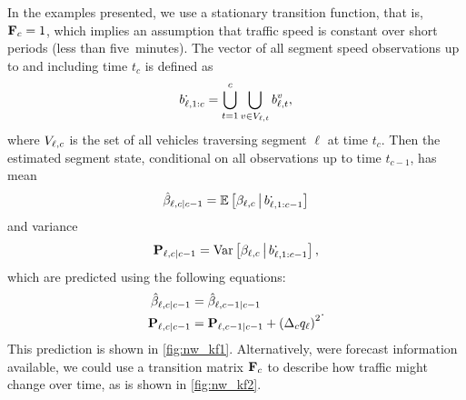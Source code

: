 In the examples presented, we use a stationary transition function, that is, $\mathbf{F}_c = 1$, which implies an assumption that traffic speed is constant over short periods (less than five~minutes). The vector of all segment speed observations up to and including time $t_{c}$ is defined as
\begin{equation}\label{eq:all_seg_obs}
b_{\ell,1:c}^{\boldsymbol{\cdot}} = \bigcup_{t=1}^{c} \bigcup_{v\in V_{\ell,t}} b_{\ell,t}^v,
\end{equation}
where $V_{\ell,c}$ is the set of all vehicles traversing segment $\ell$ at time $t_c$. Then the estimated segment state, conditional on all observations up to time $t_{c-1}$, has mean
\begin{equation}\label{eq:ch4:nw_state_mean_est}
\hat{\beta}_{\ell,c|c-1} =
    \mathbb{E}\left[\beta_{\ell,c} \,\big|\,{} b_{\ell,1:c-1}^{\boldsymbol{\cdot}}\right]
\end{equation}
and variance
\begin{equation}\label{eq:ch4:nw_state_var_est}
\mathbf{P}_{\ell,c|c-1} =
    \mathrm{Var}\left[\beta_{\ell,c} \,\big|\,{} b_{\ell,1:c-1}^{\boldsymbol{\cdot}}\right],
\end{equation}
which are predicted using the following equations:
\begin{equation}
\label{eq:nw_kf_predict}
\begin{split}
\hat{\beta}_{\ell,c|c-1} &=
    \hat{\beta}_{
\ell,c-1|c-1} \\
\mathbf{P}_{\ell,c|c-1} &= \mathbf{P}_{\ell,c-1|c-1} + \left(\Delta_cq_\ell\right)^2
\end{split}.
\end{equation}
This prediction is shown in \cref{fig:nw_kf1}. Alternatively, were forecast information available, we could use a transition matrix $\mathbf{F}_c$ to describe how traffic might change over time, as is shown in \cref{fig:nw_kf2}.


